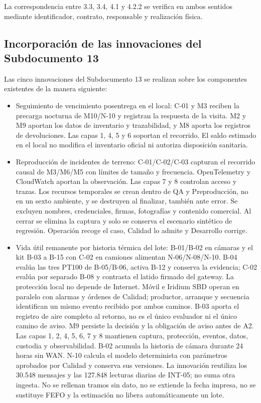 La correspondencia entre 3.3, 3.4, 4.1 y 4.2.2 se verifica en ambos sentidos mediante identificador, contrato, responsable y realización física.

\subsection*{Incorporación de las innovaciones del Subdocumento 13}
Las cinco innovaciones del Subdocumento 13 se realizan sobre los componentes existentes de la manera siguiente:
\begin{itemize}
\item Seguimiento de vencimiento posentrega en el local: C-01 y M3 reciben la precarga nocturna de M10/N-10 y registran la respuesta de la visita. M2 y M9 aportan los datos de inventario y trazabilidad, y M8 aporta los registros de devoluciones. Las capas 1, 4, 5 y 6 soportan el recorrido. El saldo estimado en el local no modifica el inventario oficial ni autoriza disposición sanitaria.
\item Reproducción de incidentes de terreno: C-01/C-02/C-03 capturan el recorrido causal de M3/M6/M5 con límites de tamaño y frecuencia. OpenTelemetry y CloudWatch aportan la observación. Las capas 7 y 8 controlan acceso y trazas. Los recursos temporales se crean dentro de QA y Preproducción, no en un sexto ambiente, y se destruyen al finalizar, también ante error. Se excluyen nombres, credenciales, firmas, fotografías y contenido comercial. Al cerrar se elimina la captura y solo se conserva el escenario sintético de regresión. Operación recoge el caso, Calidad lo admite y Desarrollo corrige.
\item Vida útil remanente por historia térmica del lote: B-01/B-02 en cámaras y el kit B-03 a B-15 con C-02 en camiones alimentan N-06/N-08/N-10. B-04 evalúa las tres PT100 de B-05/B-06, activa B-12 y conserva la evidencia; C-02 evalúa por separado B-08 y contrasta el latido firmado del gateway. La protección local no depende de Internet. Móvil e Iridium SBD operan en paralelo con alarmas y órdenes de Calidad; productor, arranque y secuencia identifican un mismo evento recibido por ambos caminos. B-03 aporta el registro de aire completo al retorno, no es el único evaluador ni el único camino de aviso. M9 persiste la decisión y la obligación de aviso antes de A2. Las capas 1, 2, 4, 5, 6, 7 y 8 mantienen captura, protección, eventos, datos, custodia y observabilidad. B-02 acumula la historia de cámara durante 24 horas sin WAN. N-10 calcula el modelo determinista con parámetros aprobados por Calidad y conserva sus versiones. La innovación reutiliza los 30.548 mensajes y las 127.848 lecturas diarias de INT-05; no suma otra ingesta. No se rellenan tramos sin dato, no se extiende la fecha impresa, no se sustituye FEFO y la estimación no libera automáticamente un lote.

\end{itemize}
